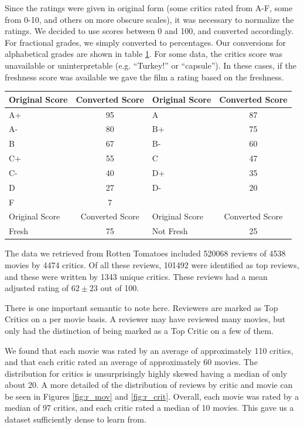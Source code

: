 \documentclass[10.5pt]{article}
\begin{document}
Since the ratings were given in original form (some critics rated from A-F, 
some from 0-10, and others on more obscure scales), it was necessary to 
normalize the ratings. We decided to use scores between 0 and 100, and converted
accordingly. For fractional grades, we simply converted to percentages. Our 
conversions for alphabetical grades are shown in table \ref{tab:conv}. For some 
data, the critics score was unavailable or uninterpretable (e.g. ``Turkey!'' or 
``capsule''). In these cases, if the freshness score was available we gave the 
film a rating based on the freshness.

\begin{table}[H]
\centering
\begin{tabular}{ | l | c | l | c |}

\hline
Original Score & Converted Score & Original Score & Converted Score \\
\hline
A+ & 95 & A  & 87 \\
A- & 80 & B+ & 75 \\
B  & 67 & B- & 60 \\
C+ & 55 & C  & 47 \\
C- & 40 & D+ & 35 \\
D  & 27 & D- & 20 \\
F  & 7 &    &     \\
\hline
Original Score & Converted Score & Original Score & Converted Score \\
\hline
Fresh & 75 & Not Fresh & 25 \\
\hline
\end{tabular}
\label{tab:conv}
\end{table}

The data we retrieved from Rotten Tomatoes included 520068 reviews of 4538 
movies by 4474 critics. Of all these reviews, 101492 were identified as top 
reviews, and these were written by 1343 unique critics. These reviews had a 
mean adjusted rating of $ 62 \pm 23$ out of 100.

There is one important semantic to note here. Reviewers are marked as Top 
Critics on a per movie basis. A reviewer may have reviewed many movies, but 
only had the distinction of being marked as a Top Critic on a few of them. 

We found that each movie was rated by an average of approximately 110 critics, 
and that each critic rated an average of approximately 60 movies. 
The distribution for critics is unsurprisingly highly skewed having a median 
of only about 20. A more detailed of the distribution of reviews by critic
and movie can be seen in Figures \ref{fig:r_mov} and \ref{fig:r_crit}.
Overall, each movie was rated by a median of 97 critics, and each critic rated 
a median of 10 movies. This gave us a dataset sufficiently dense to learn from.
\end{document}
